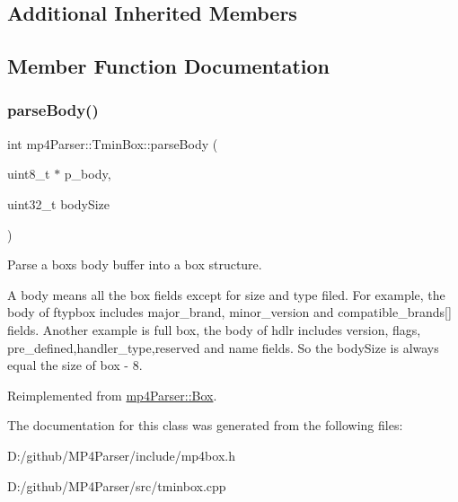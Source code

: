 \subsection*{Additional Inherited Members}


\subsection{Member Function Documentation}
\mbox{\label{classmp4_parser_1_1_tmin_box_aa6acc0171e81391f83a7ef00e89d617d}} 
\subsubsection{\texorpdfstring{parseBody()}{parseBody()}}
{\footnotesize\ttfamily int mp4\+Parser\+::\+Tmin\+Box\+::parse\+Body (\begin{DoxyParamCaption}\item[{uint8\+\_\+t $\ast$}]{p\+\_\+body,  }\item[{uint32\+\_\+t}]{body\+Size }\end{DoxyParamCaption})\hspace{0.3cm}{\ttfamily [virtual]}}



Parse a box\textquotesingle{}s body buffer into a box structure. 

A body means all the box fields except for size and type filed. For example, the body of ftypbox includes major\+\_\+brand, minor\+\_\+version and compatible\+\_\+brands\mbox{[}\mbox{]} fields. Another example is full box, the body of hdlr includes version, flags, pre\+\_\+defined,handler\+\_\+type,reserved and name fields. So the body\+Size is always equal the size of box -\/ 8. 

Reimplemented from \mbox{\hyperlink{classmp4_parser_1_1_box_a3dd0c084ac65bc77b69ac5ecaf796cb2}{mp4\+Parser\+::\+Box}}.



The documentation for this class was generated from the following files\+:\begin{DoxyCompactItemize}
\item 
D\+:/github/\+M\+P4\+Parser/include/mp4box.\+h\item 
D\+:/github/\+M\+P4\+Parser/src/tminbox.\+cpp\end{DoxyCompactItemize}
